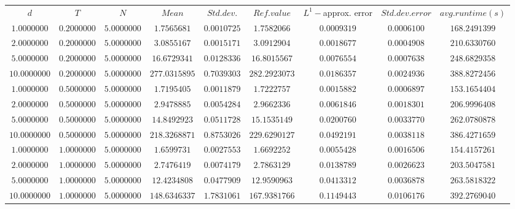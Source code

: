 \begin{tabular}{ccccccccc}
$d$ & $T$ & $N$ & $Mean$ & $Std. dev.$ & $Ref. value$ & $L^1-$approx. error & $Std. dev. error$ & $avg. runtime (s)$\\
$1.0000000$ & $0.2000000$ & $5.0000000$ & $1.7565681$ & $0.0010725$ & $1.7582066$ & $0.0009319$ & $0.0006100$ & $168.2491399$\\
$2.0000000$ & $0.2000000$ & $5.0000000$ & $3.0855167$ & $0.0015171$ & $3.0912904$ & $0.0018677$ & $0.0004908$ & $210.6330760$\\
$5.0000000$ & $0.2000000$ & $5.0000000$ & $16.6729341$ & $0.0128336$ & $16.8015567$ & $0.0076554$ & $0.0007638$ & $248.6829358$\\
$10.0000000$ & $0.2000000$ & $5.0000000$ & $277.0315895$ & $0.7039303$ & $282.2923073$ & $0.0186357$ & $0.0024936$ & $388.8272456$\\
$1.0000000$ & $0.5000000$ & $5.0000000$ & $1.7195405$ & $0.0011879$ & $1.7222757$ & $0.0015882$ & $0.0006897$ & $153.1654404$\\
$2.0000000$ & $0.5000000$ & $5.0000000$ & $2.9478885$ & $0.0054284$ & $2.9662336$ & $0.0061846$ & $0.0018301$ & $206.9996408$\\
$5.0000000$ & $0.5000000$ & $5.0000000$ & $14.8492923$ & $0.0511728$ & $15.1535149$ & $0.0200760$ & $0.0033770$ & $262.0780878$\\
$10.0000000$ & $0.5000000$ & $5.0000000$ & $218.3268871$ & $0.8753026$ & $229.6290127$ & $0.0492191$ & $0.0038118$ & $386.4271659$\\
$1.0000000$ & $1.0000000$ & $5.0000000$ & $1.6599731$ & $0.0027553$ & $1.6692252$ & $0.0055428$ & $0.0016506$ & $154.4157261$\\
$2.0000000$ & $1.0000000$ & $5.0000000$ & $2.7476419$ & $0.0074179$ & $2.7863129$ & $0.0138789$ & $0.0026623$ & $203.5047581$\\
$5.0000000$ & $1.0000000$ & $5.0000000$ & $12.4234808$ & $0.0477909$ & $12.9590963$ & $0.0413312$ & $0.0036878$ & $263.5818322$\\
$10.0000000$ & $1.0000000$ & $5.0000000$ & $148.6346337$ & $1.7831061$ & $167.9381766$ & $0.1149443$ & $0.0106176$ & $392.2769040$\\
\end{tabular}
